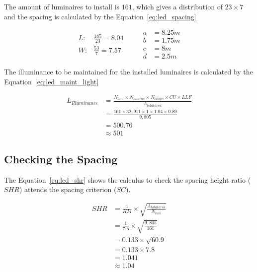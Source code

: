 The amount of luminaires to install is $161$, which gives a distribution of $23 \times 7$ and the spacing is calculated by the Equation~\ref{eq:led_spacing}

\begin{equation}
\begin{split}
L: & \frac{185}
          {23} = 8.04\\
W: & \frac{53}
          {7} = 7.57
\end{split}
\qquad
\begin{split}
a & = 8.25 m \\
b & = 1.75 m \\
c & = 8 m \\
d & = 2.5m
\end{split}
\label{eq:led_spacing}
\end{equation}

The illuminance to be maintained for the installed luminaires is calculated by the Equation~\ref{eq:led_maint_light}

\begin{equation}
\begin{split}
L_{Illuminance} & =
\frac {N_{lum} \times N_{lumens} \times N_{lamps} \times CU \times LLF}
      {A_{total\,area}} \\
 & = \frac{161 \times 32,911 \times 1 \times 1.04 \times 0.89}
          {9,805} \\
 & = 500.76 \\
 & \approx 501
\end{split}
\label{eq:led_maint_light}
\end{equation}

\subsection{Checking the Spacing}
The Equation~\ref{eq:led_shr} shows the calculus to check the spacing height ratio ($SHR$) attends the spacing criterion ($SC$).

\begin{equation}
\begin{split}
SHR & = \frac {1}{HM} \times \sqrt{\frac{A_{total\,area}}{N_{lum}}} \\
 & = \frac {1}{7.5} \times \sqrt{\frac{9,805}{161}} \\
 & = 0.133 \times \sqrt{60.9} \\
 & = 0.133 \times 7.8 \\
 & = 1.041 \\
 & \approx 1.04
\end{split}
\label{eq:led_shr}
\end{equation}

